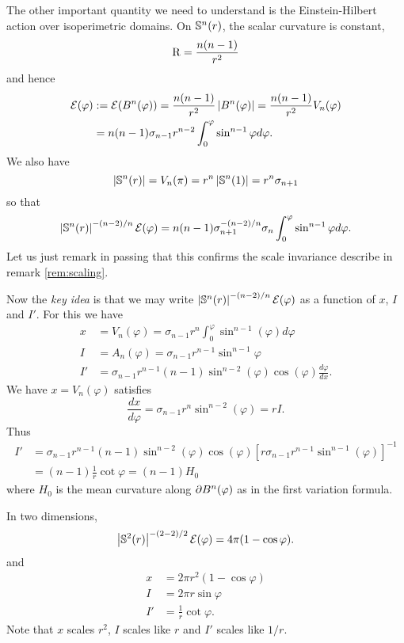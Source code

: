 \documentclass{amsart}
\begin{document}
The other important quantity we need to understand is the Einstein-Hilbert action over isoperimetric domains. On \(\S^n(r)\), the scalar curvature is constant,
\[
\Sc = \frac{n(n-1)}{r^2}
\]
and hence
\[
\begin{split}
\einsteinhilbert(\varphi) &:= \einsteinhilbert(B^n(\varphi)) = \frac{n(n-1)}{r^2} \abs{B^n(\varphi)} = \frac{n(n-1)}{r^2} V_n(\varphi) \\
&= n(n-1) \sigma_{n-1} r^{n-2} \int_0^{\varphi} \sin^{n-1} \varphi d\varphi.
\end{split}
\]
We also have
\[
\abs{\S^n(r)} = V_n(\pi) = r^n \abs{\S^n(1)} = r^n \sigma_{n+1}
\]
so that
\[
\abs{\S^n(r)}^{-(n-2)/n} \einsteinhilbert(\varphi) = n(n-1)\sigma_{n+1}^{-(n-2)/n} \sigma_n \int_0^{\varphi} \sin^{n-1} \varphi d\varphi.
\]
Let us just remark in passing that this confirms the scale invariance describe in remark \ref{rem:scaling}.

Now the \emph{key idea} is that we may write \(\abs{\S^n(r)}^{-(n-2)/n} \einsteinhilbert(\varphi)\) as a function of \(x\), \(I\) and \(I'\). For this we have
\begin{align*}
x &= V_n(\varphi) = \sigma_{n-1} r^n \int_0^{\varphi} \sin^{n-1} (\varphi) d\varphi \\
I &= A_n(\varphi) = \sigma_{n-1} r^{n-1} \sin^{n-1} \varphi \\
I' &= \sigma_{n-1} r^{n-1} (n-1) \sin^{n-2} (\varphi) \cos(\varphi)\frac{d\varphi}{dx}.
\end{align*}
We have \(x = V_n(\varphi)\) satisfies
\[
\frac{dx}{d\varphi} = \sigma_{n-1} r^n \sin^{n-2} (\varphi) = r I.
\]
Thus
\[
\begin{split}
I' &= \sigma_{n-1} r^{n-1} (n-1) \sin^{n-2} (\varphi) \cos(\varphi)\left[r \sigma_{n-1} r^{n-1} \sin^{n-1} (\varphi)\right]^{-1} \\
&= (n-1)\frac{1}{r} \cot \varphi = (n-1) H_0
\end{split}
\]
where \(H_0\) is the mean curvature along \(\bdry{B^n(\varphi)}\) as in the first variation formula.

In two dimensions,
\[
\abs{\S^2(r)}^{-(2-2)/2} \einsteinhilbert(\varphi) = 4\pi (1 - \cos\varphi).
\]
and
\begin{align*}
x &= 2\pi r^2 (1-\cos\varphi) \\
I &= 2\pi r \sin \varphi \\
I' &= \frac{1}{r} \cot \varphi.
\end{align*}
Note that \(x\) scales \(r^2\), \(I\) scales like \(r\) and \(I'\) scales like \(1/r\).
\end{document}

